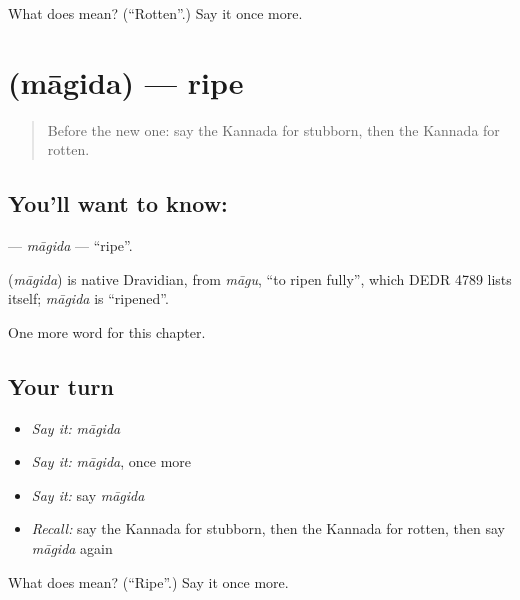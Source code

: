 \begin{tcolorbox}[breakable,colback=teal!4,colframe=teal!35!black,title={Before you move on}]
What does  mean? (\textquotedblleft{}Rotten\textquotedblright{}.) Say it once more.
\end{tcolorbox}
\section[\texorpdfstring{\kn{ಮಾಗಿದ} (māgida)}{ಮಾಗಿದ (māgida)}]{ (māgida) — ripe}

\label{lesson:KA-C182-magida}



\begin{quote}
Before the new one: say the Kannada for stubborn, then the Kannada for rotten.
\end{quote}

\subsection*{You'll want to know: }
\textbf{} — \emph{māgida} — \textquotedblleft{}ripe\textquotedblright{}.

\begin{cousinweb}
\textbf{} (\emph{māgida}) is native Dravidian, from \emph{māgu}, \textquotedblleft{}to ripen fully\textquotedblright{}, which DEDR 4789 lists itself; \emph{māgida} is \textquotedblleft{}ripened\textquotedblright{}.
\end{cousinweb}

\begin{grammarlens}[title={What you've built}]
One more word for this chapter.
\end{grammarlens}

\subsection*{Your turn}
\begin{itemize}
\raggedright
  \item \emph{Say it:} \emph{māgida}
  \item \emph{Say it:} \emph{māgida}, once more
  \item \emph{Say it:} say \emph{māgida}
  \item \emph{Recall:} say the Kannada for stubborn, then the Kannada for rotten, then say \emph{māgida} again
\end{itemize}

\begin{tcolorbox}[breakable,colback=teal!4,colframe=teal!35!black,title={Before you move on}]
What does  mean? (\textquotedblleft{}Ripe\textquotedblright{}.) Say it once more.
\end{tcolorbox}
